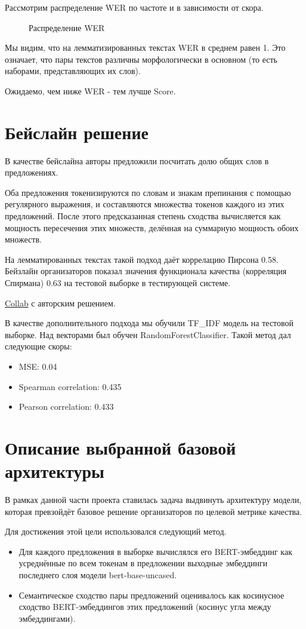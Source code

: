 \documentclass[12pt]{article}
\newcommand{\imgh}[3]
{
\begin{figure}[H]
\center{\texttt{[image: \#2]}}
\caption{#3}
\label{ris:#2}
\end{figure}
}
\begin{document}
Рассмотрим распределение WER по частоте и в зависимости от скора. 

\imgh{17cm}{wer_distribution.png}{Распределение WER}

Мы видим, что на лемматизированных текстах WER в среднем равен 1. Это означает, что пары текстов различны морфологически в основном (то есть наборами, представляющих их слов).

Ожидаемо, чем ниже WER - тем лучше Score.
\newpage

\section{Бейслайн решение}

В качестве бейслайна авторы предложили посчитать долю общих слов в предложениях.

Оба предложения токенизируются по словам и знакам препинания с помощью регулярного выражения, и составляются множества токенов каждого из этих предложений. После этого предсказанная степень сходства вычисляется как мощность пересечения этих множеств, делённая на суммарную мощность обоих множеств.

На лемматированных текстах такой подход даёт коррелацию Пирсона 0.58. Бейзлайн организаторов показал значения функционала качества (корреляция Спирмана) 0.63 на тестовой выборке в тестирующей системе.

\href{https://github.com/semantic-textual-relatedness/Semantic_Relatedness_SemEval2024/blob/main/STR_Baseline.ipynb}{Collab} с авторским решением.

В качестве дополнительного подхода мы обучили TF\_IDF модель на тестовой выборке. Над векторами был обучен RandomForestClassifier. Такой метод дал следующие скоры:
\begin{itemize}
    \item MSE: 0.04
    \item Spearman correlation: 0.435
    \item Pearson correlation: 0.433
\end{itemize}

\section{Описание выбранной базовой архитектуры}
В рамках данной части проекта ставилась задача выдвинуть архитектуру модели, которая превзойдёт базовое решение организаторов по целевой метрике качества.

Для достижения этой цели использовался следующий метод.
\begin{itemize}
    \item Для каждого предложения в выборке вычислялся его BERT-эмбеддинг как \\ усреднённые по всем токенам в предложении выходные эмбеддинги последнего слоя модели bert-base-uncased.

    \item Семантическое сходство пары предложений оценивалось как косинусное сходство BERT-эмбеддингов этих предложений (косинус угла между эмбеддингами).
\end{itemize}
\end{document}
